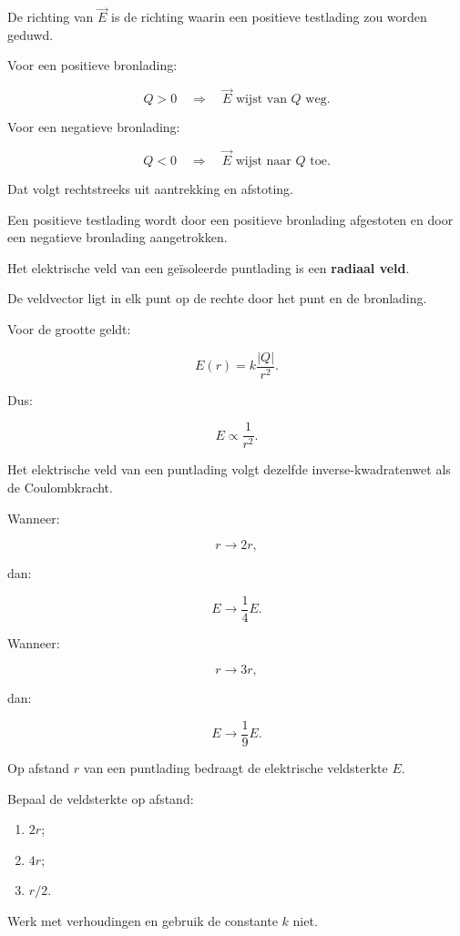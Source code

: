 \documentclass{ximera}
\begin{document}


De richting van $\vec E$ is de richting waarin een positieve
testlading zou worden geduwd.


Voor een positieve bronlading:

\[
\boxed{
Q>0
\quad\Rightarrow\quad
\vec E\text{ wijst van }Q\text{ weg}.
}
\]


Voor een negatieve bronlading:

\[
\boxed{
Q<0
\quad\Rightarrow\quad
\vec E\text{ wijst naar }Q\text{ toe}.
}
\]


Dat volgt rechtstreeks uit aantrekking en afstoting.

Een positieve testlading wordt door een positieve bronlading afgestoten
en door een negatieve bronlading aangetrokken.




Het elektrische veld van een geïsoleerde puntlading is een
\textbf{radiaal veld}.

De veldvector ligt in elk punt op de rechte door het punt en de
bronlading.

Voor de grootte geldt:

\[
\boxed{
E(r)
=
k\frac{|Q|}{r^2}.
}
\]

Dus:

\[
\boxed{
E\propto\frac{1}{r^2}.
}
\]

Het elektrische veld van een puntlading volgt dezelfde
inverse-kwadratenwet als de Coulombkracht.


Wanneer:

\[
r\rightarrow2r,
\]

dan:

\[
E\rightarrow\frac14E.
\]

Wanneer:

\[
r\rightarrow3r,
\]

dan:

\[
E\rightarrow\frac19E.
\]


\begin{oefening}{\oefB\ESS}

Op afstand $r$ van een puntlading bedraagt de elektrische veldsterkte
$E$.

Bepaal de veldsterkte op afstand:

\begin{enumerate}
  \item $2r$;
  \item $4r$;
  \item $r/2$.
\end{enumerate}

Werk met verhoudingen en gebruik de constante $k$ niet.

\end{oefening}
\end{document}
